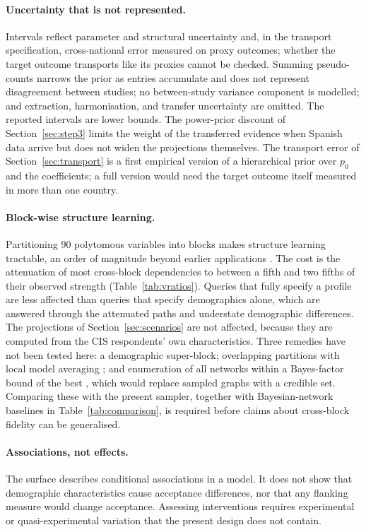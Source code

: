 \paragraph{Uncertainty that is not represented.}
Intervals reflect parameter and structural uncertainty and, in the transport
specification, cross-national error measured on proxy outcomes; whether the
target outcome transports like its proxies cannot be checked. Summing pseudo-counts
narrows the prior as entries accumulate and does not represent disagreement
between studies; no between-study variance component is modelled; and
extraction, harmonisation, and transfer uncertainty are omitted. The reported
intervals are lower bounds. The power-prior discount of
Section~\ref{sec:step3} limits the weight of the transferred evidence when
Spanish data arrive but does not widen the projections themselves. The transport
error of Section~\ref{sec:transport} is a first empirical version of a
hierarchical prior over $p_0$ and the coefficients; a full version would need
the target outcome itself measured in more than one country.

\paragraph{Block-wise structure learning.}
Partitioning 90 polytomous variables into blocks makes structure learning
tractable, an order of magnitude beyond earlier applications
\citep{martins2024}. The cost is the attenuation of most cross-block
dependencies to between a fifth and two fifths of their observed strength
(Table~\ref{tab:vratios}). Queries that fully specify a profile are less
affected than queries that specify demographics alone, which are answered
through the attenuated paths and understate demographic differences. The
projections of Section~\ref{sec:scenarios} are not affected, because they are
computed from the CIS respondents' own characteristics. Three remedies have
not been tested here: a demographic super-block; overlapping partitions with
local model averaging \citep{lu2012lsbn}; and enumeration of all networks
within a Bayes-factor bound of the best \citep{liao2020credible}, which would
replace sampled graphs with a credible set. Comparing these with the present
sampler, together with Bayesian-network baselines in
Table~\ref{tab:comparison}, is required before claims about cross-block
fidelity can be generalised.

\paragraph{Associations, not effects.}
The surface describes conditional associations in a model. It does not show
that demographic characteristics cause acceptance differences, nor that any
flanking measure would change acceptance. Assessing interventions requires
experimental or quasi-experimental variation that the present design does not
contain.

